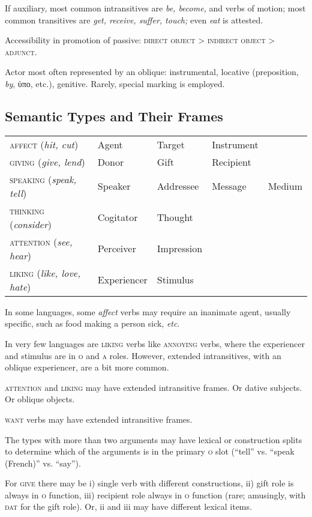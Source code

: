 \documentclass[11pt]{article}
\newcommand{\E}[1]{\textit{#1}}   %
\newcommand{\I}[1]{\textsc{#1}}   %
\begin{document}
{If auxiliary, most common intransitives are \textit{be, become,} and
verbs of motion; most common transitives are \textit{get, receive,
suffer, touch;} even \textit{eat} is attested.

Accessibility in promotion of passive: \I{direct object > indirect
object > adjunct}.

Actor most often represented by an oblique: instrumental, locative
(preposition, \textit{by}, ὑπο, etc.), genitive.  Rarely, special
marking is employed.


\subsection{Semantic Types and Their Frames}

\begin{center}
\begin{tabular}{lllll}
\I{affect} (\E{hit, cut}) & Agent & Target & Instrument \\
\I{giving} (\E{give, lend}) & Donor & Gift & Recipient \\
\I{speaking} (\E{speak, tell}) & Speaker & Addressee & Message & Medium \\
\I{thinking} (\E{consider}) & Cogitator & Thought \\
\I{attention} (\E{see, hear}) & Perceiver & Impression \\
\I{liking} (\E{like, love, hate}) & Experiencer & Stimulus
\end{tabular}
\end{center}

In some languages, some \E{affect} verbs may require an inanimate
agent, usually specific, such as food making a person sick,
\textit{etc}.

In very few languages are \I{liking} verbs like \I{annoying} verbs,
where the experiencer and stimulus are in \I{o} and \I{a} roles.
However, extended intransitives, with an oblique experiencer, are a
bit more common.

\I{attention} and \I{liking} may have extended intransitive frames.
Or dative subjects.  Or oblique objects.

\I{want} verbs may have extended intransitive frames.

The types with more than two arguments may have lexical or
construction splits to determine which of the arguments is in the
primary \I{o} slot (``tell'' vs. ``speak (French)'' vs. ``say'').

For \I{give} there may be i) single verb with different constructions,
ii) gift role is always in \I{o} function, iii) recipient role always
in \I{o} function (rare; amusingly, with \I{dat} for the gift role).
Or, ii and iii may have different lexical items.


}
\end{document}
